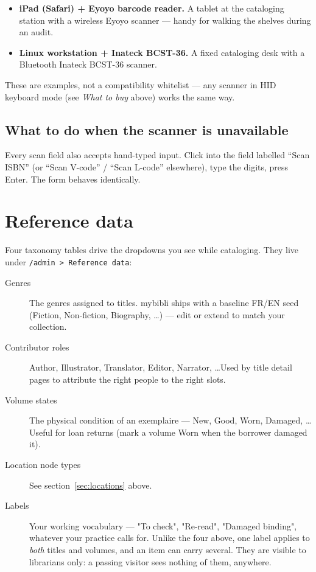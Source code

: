 \begin{itemize}
  \item \textbf{iPad (Safari) + Eyoyo barcode reader.} A tablet at
        the cataloging station with a wireless Eyoyo scanner — handy
        for walking the shelves during an audit.
  \item \textbf{Linux workstation + Inateck BCST-36.} A fixed
        cataloging desk with a Bluetooth Inateck BCST-36 scanner.
\end{itemize}

These are examples, not a compatibility whitelist — any scanner in
HID keyboard mode (see \emph{What to buy} above) works the same way.

\subsection*{What to do when the scanner is unavailable}

Every scan field also accepts hand-typed input. Click into the field
labelled ``Scan ISBN'' (or ``Scan V-code'' / ``Scan L-code''
elsewhere), type the digits, press Enter. The form behaves
identically.

\section{Reference data}\label{sec:reference-data}

Four taxonomy tables drive the dropdowns you see while
cataloging. They live under \texttt{/admin > Reference data}:

\begin{description}
  \item[Genres] The genres assigned to titles. mybibli
        ships with a baseline FR/EN seed (Fiction, Non-fiction,
        Biography, \dots) — edit or extend to match your collection.
  \item[Contributor roles] Author,
        Illustrator, Translator, Editor, Narrator, \dots Used by
        title detail pages to attribute the right people to the
        right slots.
  \item[Volume states] The physical condition
        of an exemplaire — New, Good, Worn, Damaged, \dots Useful
        for loan returns (mark a volume Worn when the borrower
        damaged it).
  \item[Location node types] See
        section~\ref{sec:locations} above.
  \item[Labels] Your working vocabulary \string— "To
        check", "Re-read", "Damaged binding", whatever your practice
        calls for. Unlike the four above, one label applies to
        \emph{both} titles and volumes, and an item can carry several.
        They are visible to librarians only: a passing visitor sees
        nothing of them, anywhere.
\end{description}

